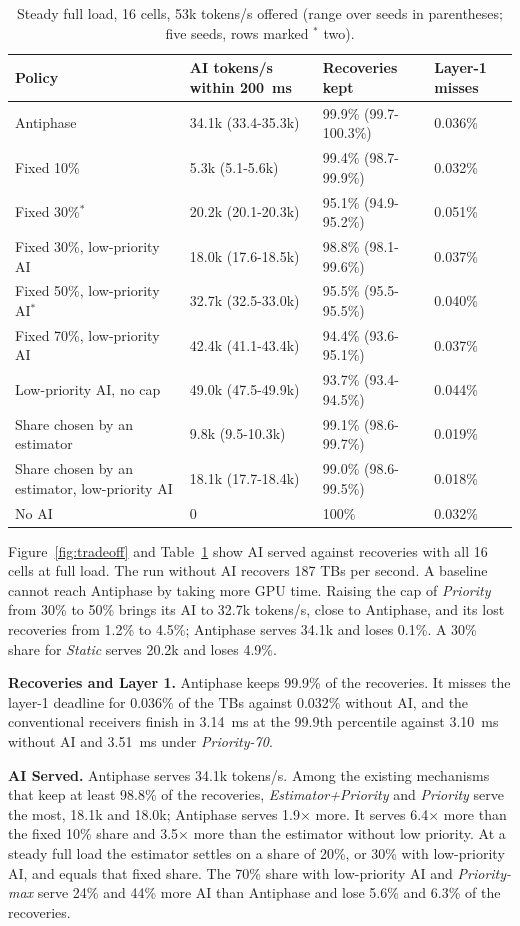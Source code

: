 \documentclass[acmsmall,screen,review,anonymous]{acmart}
\newcommand{\sys}{Antiphase\xspace}
\begin{document}
\begin{table}[t]
\caption{Steady full load, 16 cells, 53k tokens/s offered (range over seeds in parentheses; five seeds,
rows marked $^{*}$ two).}
\label{tab:steady}
\footnotesize
\begin{tabular}{@{}llll@{}}
\toprule
Policy & AI tokens/s within 200~ms & Recoveries kept & Layer-1 misses \\
\midrule
\sys & 34.1k (33.4-35.3k) & 99.9\% (99.7-100.3\%) & 0.036\% \\
Fixed 10\% & 5.3k (5.1-5.6k) & 99.4\% (98.7-99.9\%) & 0.032\% \\
Fixed 30\%$^{*}$ & 20.2k (20.1-20.3k) & 95.1\% (94.9-95.2\%) & 0.051\% \\
Fixed 30\%, low-priority AI & 18.0k (17.6-18.5k) & 98.8\% (98.1-99.6\%) & 0.037\% \\
Fixed 50\%, low-priority AI$^{*}$ & 32.7k (32.5-33.0k) & 95.5\% (95.5-95.5\%) & 0.040\% \\
Fixed 70\%, low-priority AI & 42.4k (41.1-43.4k) & 94.4\% (93.6-95.1\%) & 0.037\% \\
Low-priority AI, no cap & 49.0k (47.5-49.9k) & 93.7\% (93.4-94.5\%) & 0.044\% \\
Share chosen by an estimator & 9.8k (9.5-10.3k) & 99.1\% (98.6-99.7\%) & 0.019\% \\
Share chosen by an estimator, low-priority AI & 18.1k (17.7-18.4k) & 99.0\% (98.6-99.5\%) & 0.018\% \\
No AI & 0 & 100\% & 0.032\% \\
\bottomrule
\end{tabular}
\end{table}

Figure~\ref{fig:tradeoff} and Table~\ref{tab:steady} show AI served against recoveries with all 16
cells at full load. The run without AI recovers 187 TBs per second. A baseline cannot reach \sys by taking
more GPU time. Raising the cap of \textit{Priority} from 30\% to 50\% brings its AI to 32.7k tokens/s,
close to \sys, and its lost recoveries from 1.2\% to 4.5\%; \sys serves 34.1k and loses 0.1\%. A 30\%
share for \textit{Static} serves 20.2k and loses 4.9\%.

\noindent\textbf{Recoveries and Layer 1.} \sys keeps 99.9\% of the recoveries. It misses the layer-1
deadline for 0.036\% of the TBs against 0.032\% without AI, and the conventional receivers finish in 3.14~ms
at the 99.9th percentile against 3.10~ms without AI and 3.51~ms under \textit{Priority-70}.

\noindent\textbf{AI Served.} \sys serves 34.1k tokens/s. Among the existing mechanisms that keep at least
98.8\% of the recoveries, \textit{Estimator+Priority} and \textit{Priority} serve
the most, 18.1k and 18.0k; \sys serves 1.9$\times$ more. It serves 6.4$\times$ more than the fixed 10\%
share and 3.5$\times$ more than the estimator without low priority. At a steady full load the estimator
settles on a share of 20\%, or 30\% with low-priority AI, and equals that fixed share. The 70\% share with
low-priority AI and \textit{Priority-max} serve 24\% and 44\% more AI than \sys and lose 5.6\% and 6.3\% of the
recoveries.
\end{document}
